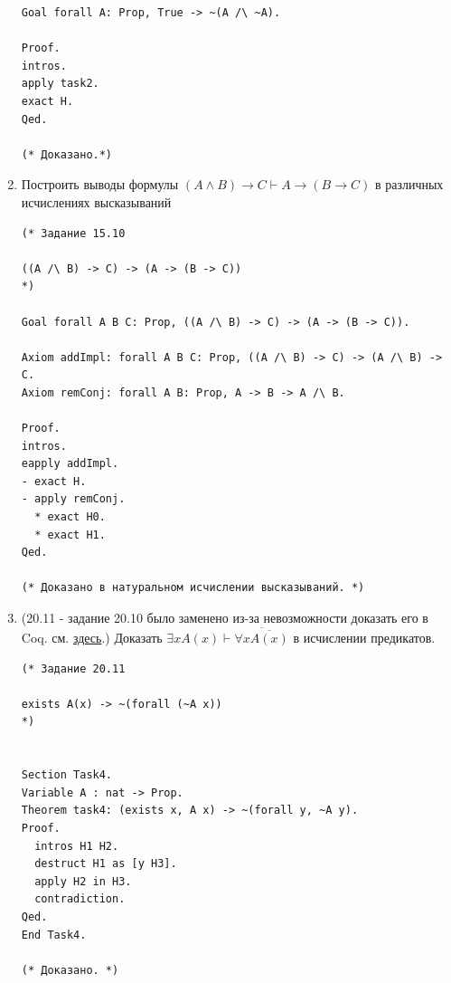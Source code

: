 \documentclass[a4paper,14pt]{extarticle}
\begin{document}
\begin{enumerate}
\begin{verbatim}
Goal forall A: Prop, True -> ~(A /\ ~A).

Proof.
intros.
apply task2.
exact H.
Qed.

(* Доказано.*) 
\end{verbatim}
\item Построить выводы формулы $(A \wedge B) \rightarrow C \vdash A \rightarrow (B \rightarrow C)$ в различных исчислениях высказываний
\begin{verbatim}
(* Задание 15.10 

((A /\ B) -> C) -> (A -> (B -> C))
*)

Goal forall A B C: Prop, ((A /\ B) -> C) -> (A -> (B -> C)).

Axiom addImpl: forall A B C: Prop, ((A /\ B) -> C) -> (A /\ B) -> C.
Axiom remConj: forall A B: Prop, A -> B -> A /\ B.

Proof.
intros.
eapply addImpl.
- exact H.
- apply remConj.
  * exact H0.
  * exact H1.
Qed.

(* Доказано в натуральном исчислении высказываний. *)
\end{verbatim}

\item (20.11 - задание 20.10 было заменено из-за невозможности доказать его в Coq. см. \href{https://stackoverflow.com/questions/35518303/is-this-relationship-between-forall-and-exists-provable-in-coq-intuitionistic-lo}{здесь}.) Доказать $\exists x A(x) \vdash \overline{\forall x \overline{A(x)}}$ в исчислении предикатов.

\begin{verbatim}
(* Задание 20.11

exists A(x) -> ~(forall (~A x))
*)


Section Task4.
Variable A : nat -> Prop.
Theorem task4: (exists x, A x) -> ~(forall y, ~A y).
Proof.
  intros H1 H2.
  destruct H1 as [y H3].
  apply H2 in H3.
  contradiction.
Qed.
End Task4.

(* Доказано. *)
\end{verbatim}

\end{enumerate}
\end{document}
